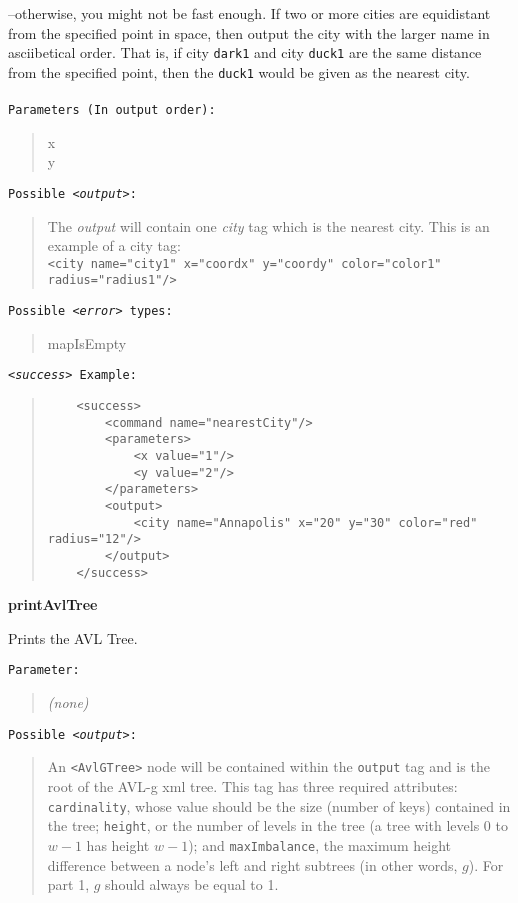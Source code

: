 \documentclass[12pt]{article}
\newenvironment{Description}
   {\begin{list}{}{\let\makelabel\Descriptionlabel
      \setlength\leftmargin{\labelwidth+\labelsep}
      \setlength\itemindent{-0.3em}}}%
   {\end{list}}
\newcommand*{\Descriptionlabel}[1]{%
  \parbox[b]{\labelwidth}
  {\makebox[0pt][l]{\textbf{#1}}\\}
  \hfill}
\begin{document}
\begin{Description}
\begin{Description}
--otherwise, you
  	might not be fast enough. If two or more cities are
        equidistant from the specified point in space, then output the
        city with  the larger name in asciibetical order. That is, if
        city  \texttt{dark1}  and city \texttt{duck1}  are the same
        distance from the specified point, then  the \texttt{duck1}
        would be given as the nearest city. \\\\
  	\texttt{Parameters (In output order):}
	\begin{quote}
		x\\
		y
	\end{quote}
	\texttt{Possible \emph{<output>}:}
	\begin{quote}
		The \emph{output} will contain one \emph{city} tag which is the nearest city. This is an example of a city tag:\\
		\texttt{<city name="city1" x="coordx" y="coordy" color="color1" radius="radius1"/>}
	\end{quote}
   	\texttt{Possible \emph{<error>} types:}
	\begin{quote}
		mapIsEmpty
	\end{quote}
	\texttt{\emph{<success>} Example:}
	\begin{quote}
	\begin{verbatim}
	<success>
	    <command name="nearestCity"/>
	    <parameters>
	        <x value="1"/>
	        <y value="2"/>
	    </parameters>
	    <output>
	        <city name="Annapolis" x="20" y="30" color="red" radius="12"/>
	    </output>
	</success>
	\end{verbatim}
	\end{quote}


	\item[\textbf{printAvlTree}]

	Prints the AVL Tree.
  
	\texttt{Parameter:}
	
  \begin{quote}
		\emph{(none)}
	\end{quote}
	
  \texttt{Possible \emph{<output>}:}
	\begin{quote}
	An \texttt{<AvlGTree>} node will be contained within the \texttt{output} tag and is the root of the AVL-g xml tree. This tag has three required attributes: \texttt{cardinality}, whose value should be the size (number of keys) contained in the tree; \texttt{height}, or the number of levels in the tree (a tree with levels $0$ to $w-1$ has height $w-1$); and \texttt{maxImbalance}, the maximum height difference between a node's left and right subtrees (in other words, $g$). For part 1, $g$ should always be equal to 1.


\end{quote}
\end{Description}
\end{Description}
\end{document}
